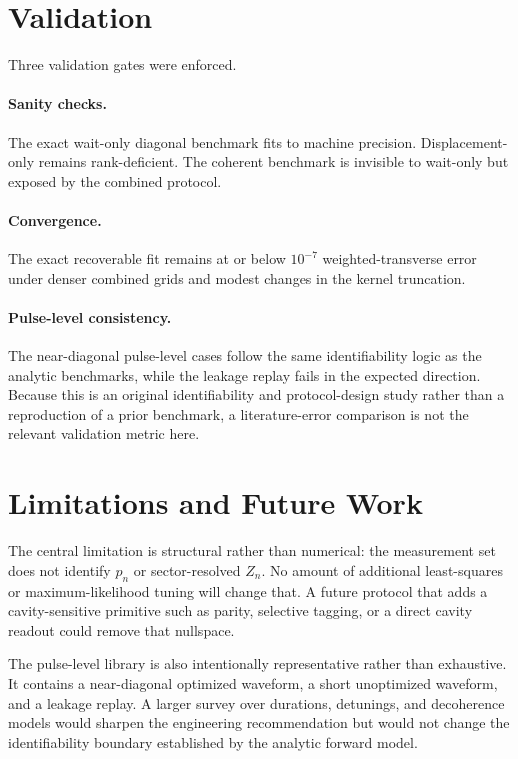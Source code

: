 \documentclass[11pt]{article}
\begin{document}
\section{Validation}
Three validation gates were enforced.
\paragraph{Sanity checks.}
The exact wait-only diagonal benchmark fits to machine precision.
Displacement-only remains rank-deficient. The coherent benchmark is invisible to
wait-only but exposed by the combined protocol.

\paragraph{Convergence.}
The exact recoverable fit remains at or below $10^{-7}$ weighted-transverse
error under denser combined grids and modest changes in the kernel truncation.

\paragraph{Pulse-level consistency.}
The near-diagonal pulse-level cases follow the same identifiability logic as
the analytic benchmarks, while the leakage replay fails in the expected
direction.
Because this is an original identifiability and protocol-design study rather
than a reproduction of a prior benchmark, a literature-error comparison is not
the relevant validation metric here.

\section{Limitations and Future Work}
The central limitation is structural rather than numerical: the measurement set
does not identify $p_n$ or sector-resolved $Z_n$. No amount of additional
least-squares or maximum-likelihood tuning will change that. A future protocol
that adds a cavity-sensitive primitive such as parity, selective tagging, or a
direct cavity readout could remove that nullspace.

The pulse-level library is also intentionally representative rather than
exhaustive. It contains a near-diagonal optimized waveform, a short unoptimized
waveform, and a leakage replay. A larger survey over durations, detunings, and
decoherence models would sharpen the engineering recommendation but would not
change the identifiability boundary established by the analytic forward model.
\end{document}
